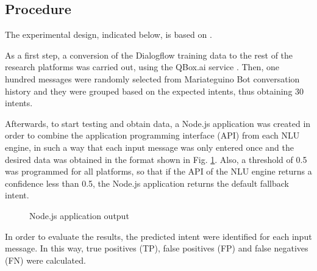 \documentclass[conference]{IEEEtran}
\begin{document}
\subsection{Procedure}
The experimental design, indicated below, is based on \cite{Braun2017}.

As a first step, a conversion of the Dialogflow training data to the rest of the research platforms was carried out, using the QBox.ai service \cite{qbox2020}. Then, one hundred messages were randomly selected from Mariateguino Bot conversation history and they were grouped based on the expected intents, thus obtaining 30 intents.

Afterwards, to start testing and obtain data, a Node.js application was created in order to combine the application programming interface (API) from each NLU engine, in such a way that each input message was only entered once and the desired data was obtained in the format shown in Fig. \ref{fig:nludata}. Also, a threshold of 0.5 was programmed for all platforms, so that if the API of the NLU engine returns a confidence less than 0.5, the Node.js application returns the default fallback intent.

\begin{figure}[t]
    \centerline{}
    \caption{Node.js application output}
    \label{fig:nludata}
\end{figure}

In order to evaluate the results, the predicted intent were identified for each input message. In this way, true positives (TP), false positives (FP) and false negatives (FN) were calculated.
\end{document}
